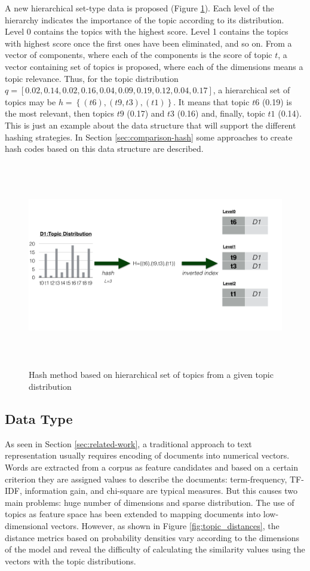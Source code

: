 A new hierarchical set-type data is proposed (Figure \ref{fig:hash_functions}). Each level of the hierarchy indicates the importance of the topic according to its distribution. Level 0 contains the topics with the highest score. Level 1 contains the topics with highest score once the first ones have been eliminated, and so on. From a vector of components, where each of the components is the score of topic $t$, a  vector containing set of topics is proposed, where each of the dimensions means a topic relevance. Thus, for the topic distribution
$q=[0.02,0.14,0.02,0.16,0.04,0.09,0.19,0.12,0.04,0.17]$, a hierarchical set of topics may be $h=\left \{(t6),(t9,t3),(t1) \right \}$. It means that topic $t6$ (0.19) is the most relevant, then topics $t9$ (0.17) and $t3$ (0.16) and, finally, topic $t1$ (0.14). This is just an example about the data structure that will support the different hashing strategies. In Section \ref{sec:comparison-hash} some approaches to create hash codes based on this data structure are described.

\begin{figure}
\includegraphics[width=\textwidth,height=9cm]{hashFunctions.png}
\caption{Hash method based on hierarchical set of topics from a given topic distribution}
\label{fig:hash_functions}
\end{figure}

\subsection{Data Type}
\label{sec:comparison-datatype}
As seen in Section \ref{sec:related-work}, a traditional approach to text representation usually requires encoding of documents into numerical vectors. Words are extracted from a corpus as feature candidates and based on a certain criterion they are assigned values to describe the documents: term-frequency, TF-IDF, information gain, and chi-square are typical measures. But this causes two main problems: huge number of dimensions and sparse distribution. The use of topics as feature space has been extended to mapping documents into low-dimensional vectors. However, as shown in Figure \ref{fig:topic_distances}, the distance metrics based on probability densities vary according to the dimensions of the model and reveal the difficulty of calculating the similarity values using the vectors with the topic distributions.  

